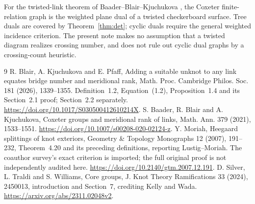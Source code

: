 \documentclass[11pt]{article}
\begin{document}
For the twisted-link theorem of Baader--Blair--Kjuchukova
\cite{bbk}, the Coxeter finite-relation graph is the weighted plane
dual of a twisted checkerboard surface.  Tree duals are covered
by Theorem~\ref{thm:det}; cyclic duals require the general weighted
incidence criterion.  The present note makes no assumption that
a twisted diagram realizes crossing number, and does not rule
out cyclic dual graphs by a crossing-count heuristic.

\begin{thebibliography}{9}
 R. Blair, A. Kjuchukova and E. Pfaff,
Adding a suitable unknot to any link equates bridge number and
meridional rank, Math. Proc. Cambridge Philos. Soc. 181 (2026),
1339--1355. Definition~1.2, Equation~(1.2), Proposition~1.4
and its Section~2.1 proof; Section~2.2 separately.
\url{https://doi.org/10.1017/S030500412610214X}.
 S. Baader, R. Blair and A. Kjuchukova,
Coxeter groups and meridional rank of links,
Math. Ann. 379 (2021), 1533--1551.
\url{https://doi.org/10.1007/s00208-020-02124-z}.
 Y. Moriah, Heegaard splittings of knot exteriors,
Geometry \& Topology Monographs 12 (2007), 191--232,
Theorem~4.20 and its preceding definitions, reporting
Lustig--Moriah.  The coauthor survey's exact criterion is imported;
the full original proof is not independently audited here.
\url{https://doi.org/10.2140/gtm.2007.12.191}.
 D. Silver, L. Traldi and S. Williams,
Core groups, J. Knot Theory Ramifications 33 (2024), 2450013,
introduction and Section~7, crediting Kelly and Wada.
\url{https://arxiv.org/abs/2311.02048v2}.
\end{thebibliography}
\end{document}

